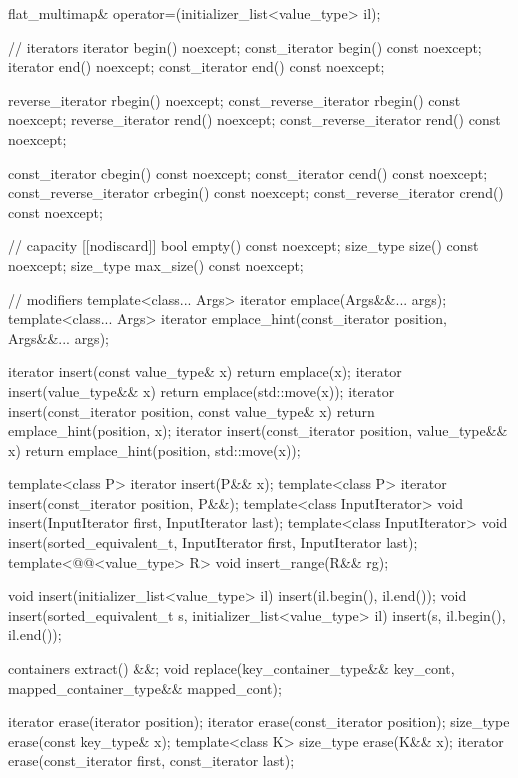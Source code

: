 \begin{codeblock}
{{    flat_multimap& operator=(initializer_list<value_type> il);

    // iterators
    iterator               begin() noexcept;
    const_iterator         begin() const noexcept;
    iterator               end() noexcept;
    const_iterator         end() const noexcept;

    reverse_iterator       rbegin() noexcept;
    const_reverse_iterator rbegin() const noexcept;
    reverse_iterator       rend() noexcept;
    const_reverse_iterator rend() const noexcept;

    const_iterator         cbegin() const noexcept;
    const_iterator         cend() const noexcept;
    const_reverse_iterator crbegin() const noexcept;
    const_reverse_iterator crend() const noexcept;

    // capacity
    [[nodiscard]] bool empty() const noexcept;
    size_type size() const noexcept;
    size_type max_size() const noexcept;

    // modifiers
    template<class... Args> iterator emplace(Args&&... args);
    template<class... Args>
      iterator emplace_hint(const_iterator position, Args&&... args);

    iterator insert(const value_type& x)
      { return emplace(x); }
    iterator insert(value_type&& x)
      { return emplace(std::move(x)); }
    iterator insert(const_iterator position, const value_type& x)
      { return emplace_hint(position, x); }
    iterator insert(const_iterator position, value_type&& x)
      { return emplace_hint(position, std::move(x)); }

    template<class P> iterator insert(P&& x);
    template<class P>
      iterator insert(const_iterator position, P&&);
    template<class InputIterator>
      void insert(InputIterator first, InputIterator last);
    template<class InputIterator>
      void insert(sorted_equivalent_t, InputIterator first, InputIterator last);
    template<@@<value_type> R>
      void insert_range(R&& rg);

    void insert(initializer_list<value_type> il)
      { insert(il.begin(), il.end()); }
    void insert(sorted_equivalent_t s, initializer_list<value_type> il)
      { insert(s, il.begin(), il.end()); }

    containers extract() &&;
    void replace(key_container_type&& key_cont, mapped_container_type&& mapped_cont);

    iterator erase(iterator position);
    iterator erase(const_iterator position);
    size_type erase(const key_type& x);
    template<class K> size_type erase(K&& x);
    iterator erase(const_iterator first, const_iterator last);

}}
\end{codeblock}
